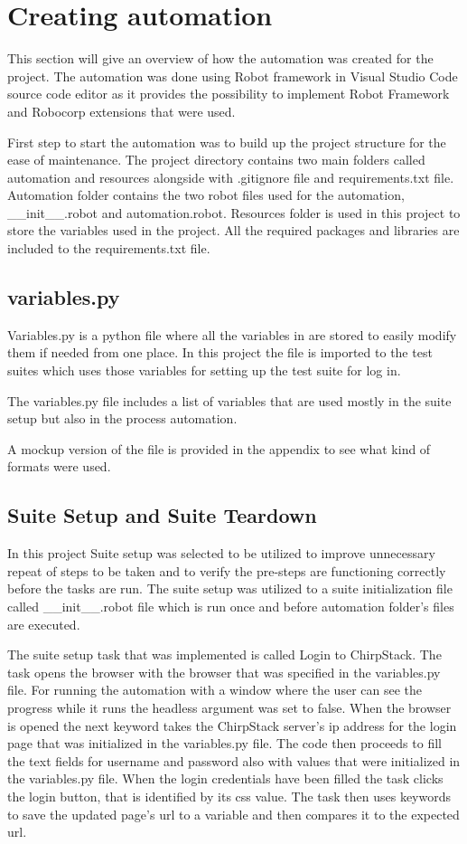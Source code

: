 \section{Creating automation}
This section will give an overview of how the automation was created for the project.
The automation was done using Robot framework in Visual Studio Code source code editor as it provides the possibility to implement Robot Framework and Robocorp extensions that were used.

First step to start the automation was to build up the project structure for the ease of maintenance.
The project directory contains two main folders called automation and resources alongside with .gitignore file and requirements.txt file.
Automation folder contains the two robot files used for the automation, \_\_init\_\_.robot and automation.robot.
Resources folder is used in this project to store the variables used in the project.
All the required packages and libraries are included to the requirements.txt file.

\subsection{variables.py}
Variables.py is a python file where all the variables in are stored to easily modify them if needed from one place.
In this project the file is imported to the test suites which uses those variables for setting up the test suite for log in.

The variables.py file includes a list of variables that are used mostly in the suite setup but also in the process automation.

A mockup version of the file is provided in the appendix to see what kind of formats were used.

\subsection{Suite Setup and Suite Teardown}
In this project Suite setup was selected to be utilized to improve unnecessary repeat of steps to be taken and to verify the pre-steps are functioning correctly before the tasks are run.
The suite setup was utilized to a suite initialization file called \_\_init\_\_.robot file which is run once and before automation folder's files are executed.

The suite setup task that was implemented is called Login to ChirpStack.
The task opens the browser with the browser that was specified in the variables.py file.
For running the automation with a window where the user can see the progress while it runs the headless argument was set to false.
When the browser is opened the next keyword takes the ChirpStack server's \gls{ip} address for the login page that was initialized in the variables.py file.
The code then proceeds to fill the text fields for username and password also with values that were initialized in the variables.py file.
When the login credentials have been filled the task clicks the login button, that is identified by its css value.
The task then uses keywords to save the updated page's \gls{url} to a variable and then compares it to the expected \gls{url}.

